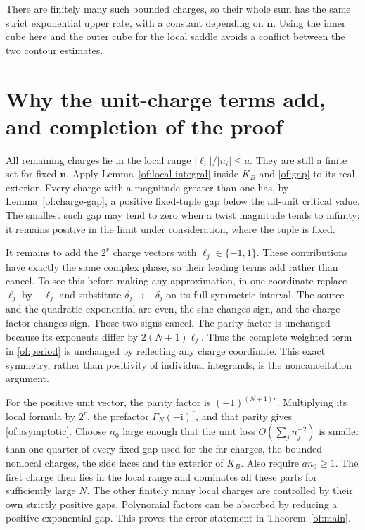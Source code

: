 \documentclass[11pt]{article}
\numberwithin{equation}{section}
\theoremstyle{definition}\newtheorem{definition}[theorem]{Definition}
\theoremstyle{remark}\newtheorem{remark}[theorem]{Remark}
\newcommand{\ii}{\mathrm i}
\begin{document}
There are finitely many such bounded charges, so their whole sum has
the same strict exponential upper rate, with a constant depending on
$\boldsymbol n$. Using the inner cube here and the outer cube for
the local saddle avoids a conflict between the two contour estimates.

\section{Why the unit-charge terms add, and completion of the proof}

All remaining charges lie in the local range
$|\ell_i|/|n_i|\le a$. They are still a finite set for fixed
$\boldsymbol n$. Apply Lemma~\ref{of:local-integral} inside $K_B$
and \eqref{of:gap} to its real exterior. Every charge with a
magnitude greater than one has, by Lemma~\ref{of:charge-gap}, a
positive fixed-tuple gap below the all-unit critical value. The
smallest such gap may tend to zero when a twist magnitude tends to
infinity; it remains positive in the limit under consideration,
where the tuple is fixed.

It remains to add the $2^r$ charge vectors with
$\ell_j\in\{-1,1\}$. These contributions have exactly the same
complex phase, so their leading terms add rather than cancel. To see
this before making any approximation,
in one coordinate replace $\ell_j$ by $-\ell_j$ and substitute
$\delta_j\mapsto-\delta_j$ on its full symmetric interval.
The source and the quadratic exponential are even, the sine changes sign, and
the charge factor changes sign. Those two signs cancel.
The parity factor is unchanged because its exponents differ by
$2(N+1)\ell_j$. Thus the complete weighted term in
\eqref{of:period} is unchanged by reflecting any charge coordinate.
This exact symmetry, rather than positivity of individual integrands,
is the noncancellation argument.

For the positive unit vector, the parity factor is
$(-1)^{(N+1)r}$. Multiplying its local formula by $2^r$, the
prefactor $\Gamma_N(-\ii)^r$, and that parity gives
\eqref{of:asymptotic}. Choose $n_0$ large enough that the unit
loss $O(\sum_j n_j^{-2})$ is smaller than one quarter of every
fixed gap used for the far charges, the bounded nonlocal charges,
the side faces and the exterior of $K_B$. Also require $a n_0\ge1$.
The first charge then lies in the local range and dominates all these
parts for sufficiently large $N$. The other finitely many local
charges are controlled by their own strictly positive gaps.
Polynomial factors can be absorbed by reducing a positive exponential
gap. This proves the error statement in Theorem~\ref{of:main}.
\end{document}
